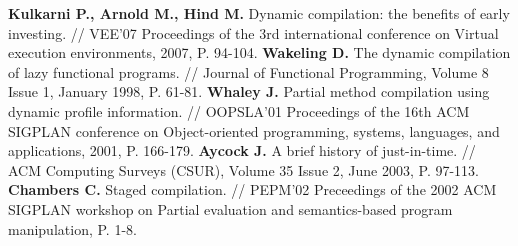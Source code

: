 \newpage

\renewcommand{\baselinestretch}{1.0}
\begin{thebibliography}{99}


\textbf{Kulkarni P., Arnold M., Hind M.} Dynamic compilation: the benefits of early investing. // VEE'07 Proceedings of the 3rd international conference on Virtual execution environments, 2007, P. 94-104.
\textbf{Wakeling D.} The dynamic compilation of lazy functional programs. // Journal of Functional Programming, Volume 8 Issue 1, January 1998, P. 61-81.
\textbf{Whaley J.} Partial method compilation using dynamic profile information. // OOPSLA'01 Proceedings of the 16th ACM SIGPLAN conference on Object-oriented programming, systems, languages, and applications, 2001, P. 166-179.
\textbf{Aycock J.} A brief history of just-in-time. // ACM Computing Surveys (CSUR), Volume 35 Issue 2, June 2003, P. 97-113.
\textbf{Chambers C.} Staged compilation. // PEPM'02 Preceedings of the 2002 ACM SIGPLAN workshop on Partial evaluation and semantics-based program manipulation, P. 1-8.






\end{thebibliography}